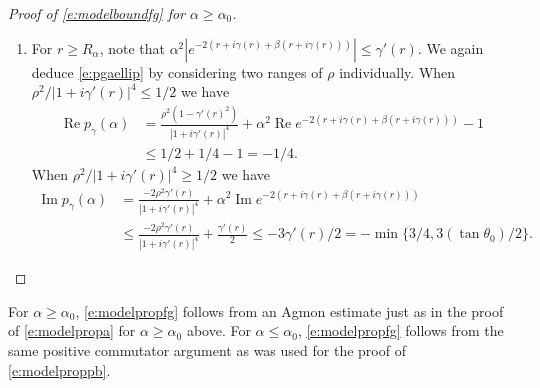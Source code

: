 \documentclass[reqno, 12pt]{amsart}
\DeclareMathOperator \re {Re}
\DeclareMathOperator \im {Im}
\theoremstyle{definition}
\numberwithin{equation}{section}
\numberwithin{prop}{section}
\numberwithin{figure}{section}
\begin{document}
\begin{proof}[Proof of \eqref{e:modelboundfg} for $\alpha \ge \alpha_0$]
\begin{enumerate}
\item For $r \ge R_\alpha$, note that $\alpha^2 |e^{-2(r + i \gamma(r) + \beta(r + i \gamma(r)))}| \le \gamma'(r)$. We again deduce \eqref{e:pgaellip} by considering two ranges of $\rho$ individually. When $\rho^2/|1 +i\gamma'(r)|^4 \le 1/2$ we have
\[\begin{split}
\re p_\gamma(\alpha) &= \frac{\rho^2(1-\gamma'(r)^2)}{|1 + i\gamma'(r)|^4} + \alpha^2\re e^{-2(r + i \gamma(r) + \beta(r + i \gamma(r)))} - 1 \\
&\le 1/2 + 1/4- 1 = -1/4.
\end{split}\]
When $\rho^2/|1 +i\gamma'(r)|^4  \ge 1/2$ we have
\[\begin{split}
\im p_\gamma(\alpha) &=  \frac{-2\rho^2\gamma'(r)}{|1 + i\gamma'(r)|^4} + \alpha^2\im e^{-2(r + i \gamma(r) + \beta(r + i \gamma(r)))}\\
&\le  \frac{-2\rho^2\gamma'(r)}{|1 + i\gamma'(r)|^4} + \frac{\gamma'(r)}2 \le -3\gamma'(r)/2= -\min\{3/4,3(\tan \theta_0)/2\}.
\end{split}\] 
\end{enumerate}
\end{proof}

For $\alpha \ge \alpha_0$, \eqref{e:modelpropfg} follows from an Agmon estimate just as in the proof of  \eqref{e:modelpropa} for $\alpha \ge \alpha_0$ above. For $\alpha \le \alpha_0$, \eqref{e:modelpropfg} follows from the same positive commutator argument as was used for the proof of \eqref{e:modelproppb}.
\end{document}
